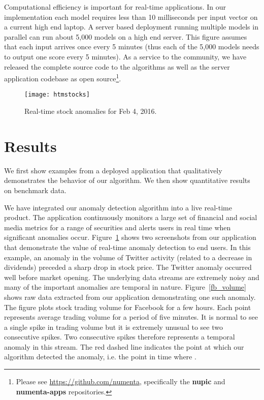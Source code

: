 \documentclass{article}
\begin{document}
Computational efficiency is important for real-time applications. In our
implementation each model requires less than 10 milliseconds per input vector on
a current high end laptop. A server based deployment running multiple models in
parallel can run about 5,000 models on a high end server. This figure assumes
that each input arrives once every 5 minutes (thus each of the 5,000 models
needs to output one score every 5 minutes). As a service to the community, we
have released the complete source code to the algorithms as well as the server
application codebase as open source\footnote{Please see
\url{https://github.com/numenta}, specifically the {\bf nupic} and {\bf numenta-apps}
repositories.}.

\begin{figure}[ht]
\vskip 0.1in
\begin{center}
\centerline{\texttt{[image: htmstocks]}}
\caption{Real-time stock anomalies for Feb 4, 2016.}
\label{htmstocks}
\end{center}
\vskip -0.1in
\end{figure}


\section{Results}

We first show examples from a deployed application that
qualitatively demonstrates the behavior of our algorithm. We then show
quantitative results on benchmark data.

We have integrated our anomaly detection algorithm into a live real-time
product. The application continuously monitors a large set of financial and
social media metrics for a range of securities and alerts users in real time
when significant anomalies occur. Figure~\ref{htmstocks} shows two screenshots
from our application that demonstrate the value of real-time anomaly detection
to end users. In this example, an anomaly in the volume of Twitter activity
(related to a decrease in dividends) preceded a sharp drop in stock price.  The
Twitter anomaly occurred well before market opening. The underlying data streams
are extremely noisy and many of the important anomalies are temporal in nature.
Figure~\ref{fb_volume} shows raw data extracted from our application
demonstrating one such anomaly. The figure plots stock trading volume for
Facebook for a few hours. Each point represents average trading volume for a
period of five minutes. It is normal to see a single spike in trading volume but
it is extremely unusual to see two consecutive spikes. Two consecutive spikes therefore
represents a temporal anomaly in this stream. The red dashed line
indicates the point at which our algorithm detected the anomaly, i.e. the point
in time where .
\end{document}
